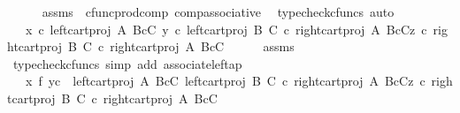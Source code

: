 \begin{isabellebody}
\ \ \ \ \isamarkupfalse%
\ assms\ \ cfunc{\isacharunderscore}{\kern0pt}prod{\isacharunderscore}{\kern0pt}comp\ comp{\isacharunderscore}{\kern0pt}associative{}\ \isamarkupfalse%
\ {\isacharparenleft}{\kern0pt}typecheck{\isacharunderscore}{\kern0pt}cfuncs{\isacharcomma}{\kern0pt}\ auto{\isacharparenright}{\kern0pt}\isanewline
\ \ \isamarkupfalse%
\ \isamarkupfalse%
\ {\isachardoublequoteopen}{\isachardot}{\kern0pt}{\isachardot}{\kern0pt}{\isachardot}{\kern0pt}\ {\isacharequal}{\kern0pt}\ {\isasymlangle}{\isasymlangle}x\ {\isasymcirc}\isactrlsub c\ left{\isacharunderscore}{\kern0pt}cart{\isacharunderscore}{\kern0pt}proj\ A\ {\isacharparenleft}{\kern0pt}B{\isasymtimes}\isactrlsub cC{\isacharparenright}{\kern0pt}{\isacharcomma}{\kern0pt}\ y\ {\isasymcirc}\isactrlsub c\ left{\isacharunderscore}{\kern0pt}cart{\isacharunderscore}{\kern0pt}proj\ B\ C\ {\isasymcirc}\isactrlsub c\ right{\isacharunderscore}{\kern0pt}cart{\isacharunderscore}{\kern0pt}proj\ A\ {\isacharparenleft}{\kern0pt}B{\isasymtimes}\isactrlsub cC{\isacharparenright}{\kern0pt}{\isasymrangle}{\isacharcomma}{\kern0pt}z\ {\isasymcirc}\isactrlsub c\ right{\isacharunderscore}{\kern0pt}cart{\isacharunderscore}{\kern0pt}proj\ B\ C\ {\isasymcirc}\isactrlsub c\ right{\isacharunderscore}{\kern0pt}cart{\isacharunderscore}{\kern0pt}proj\ A\ {\isacharparenleft}{\kern0pt}B{\isasymtimes}\isactrlsub cC{\isacharparenright}{\kern0pt}{\isasymrangle}{\isachardoublequoteclose}\isanewline
\ \ \ \ \isamarkupfalse%
\ assms\ \isamarkupfalse%
\ {\isacharparenleft}{\kern0pt}typecheck{\isacharunderscore}{\kern0pt}cfuncs{\isacharcomma}{\kern0pt}\ simp\ add{\isacharcolon}{\kern0pt}\ associate{\isacharunderscore}{\kern0pt}left{\isacharunderscore}{\kern0pt}ap{\isacharparenright}{\kern0pt}\isanewline
\ \ \isamarkupfalse%
\ \isamarkupfalse%
\ {\isachardoublequoteopen}{\isachardot}{\kern0pt}{\isachardot}{\kern0pt}{\isachardot}{\kern0pt}\ {\isacharequal}{\kern0pt}\ {\isasymlangle}{\isacharparenleft}{\kern0pt}x\ {\isasymtimes}\isactrlsub f\ y{\isacharparenright}{\kern0pt}{\isasymcirc}\isactrlsub c\ {\isasymlangle}\ left{\isacharunderscore}{\kern0pt}cart{\isacharunderscore}{\kern0pt}proj\ A\ {\isacharparenleft}{\kern0pt}B{\isasymtimes}\isactrlsub cC{\isacharparenright}{\kern0pt}{\isacharcomma}{\kern0pt}\ left{\isacharunderscore}{\kern0pt}cart{\isacharunderscore}{\kern0pt}proj\ B\ C\ {\isasymcirc}\isactrlsub c\ right{\isacharunderscore}{\kern0pt}cart{\isacharunderscore}{\kern0pt}proj\ A\ {\isacharparenleft}{\kern0pt}B{\isasymtimes}\isactrlsub cC{\isacharparenright}{\kern0pt}{\isasymrangle}{\isacharcomma}{\kern0pt}z\ {\isasymcirc}\isactrlsub c\ right{\isacharunderscore}{\kern0pt}cart{\isacharunderscore}{\kern0pt}proj\ B\ C\ {\isasymcirc}\isactrlsub c\ right{\isacharunderscore}{\kern0pt}cart{\isacharunderscore}{\kern0pt}proj\ A\ {\isacharparenleft}{\kern0pt}B{\isasymtimes}\isactrlsub cC{\isacharparenright}{\kern0pt}{\isasymrangle}{\isachardoublequoteclose}\isanewline

\end{isabellebody}
